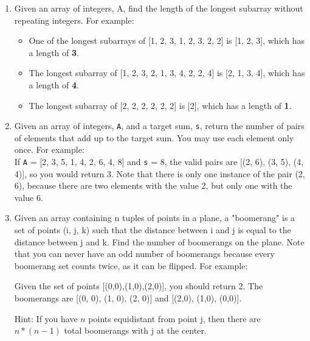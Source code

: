 \documentclass{article}
\begin{document}
\begin{enumerate}
        \item  Given an array of integers, A, find the length of the longest subarray without repeating integers.  For example:

        \begin{itemize}
            \item One of the longest subarrays of [1, 2, 3, 1, 2, 3, 2, 2] is [1, 2, 3], which has a length of \textbf{3}.
            \item The longest subarray of [1, 2, 3, 2, 1, 3, 4, 2, 2, 4] is [2, 1, 3, 4], which has a length of \textbf{4}.
            \item The longest subarray of [2, 2, 2, 2, 2, 2] is [2], which has a length of \textbf{1}.
        \end{itemize}


        \item Given an array of integers, \texttt{A}, and a target sum, \texttt{s}, return the number of pairs of elements that add up to the target sum.  You may use each element only once.  For example: \\

        If \texttt{A} = [2, 3, 5, 1, 4, 2, 6, 4, 8] and \texttt{s} = 8, the valid pairs are [(2, 6), (3, 5), (4, 4)], so you would return 3.  Note that there is only one instance of the pair (2, 6), because there are two elements with the value 2, but only one with the value 6. \\


        \item Given an array containing n tuples of points in a plane, a "boomerang" is a set of points (i, j, k) such that the distance between i and j is equal to the distance between j and k.  Find the number of boomerangs on the plane. Note that you can never have an odd number of boomerangs because every boomerang set counts twice, as it can be flipped. For example:

        Given the set of points [(0,0),(1,0),(2,0)], you should return 2.  The boomerangs are [(0, 0), (1, 0), (2, 0)] and [(2,0), (1,0), (0,0)].

        Hint: If you have $n$ points equidistant from point j, then there are $n*(n-1)$ total boomerangs with j at the center.

    \end{enumerate}

    \clearpage


\end{document}
